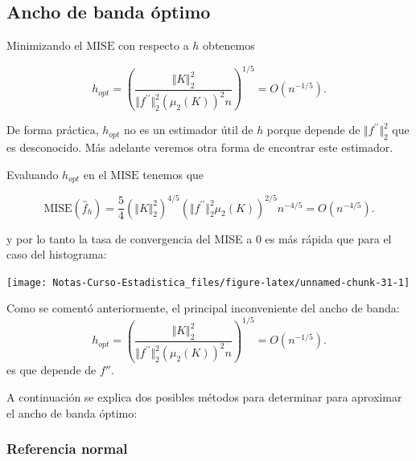 \documentclass[
  12pt,
]{book}
\begin{document}
\hypertarget{ancho-de-banda-uxf3ptimo}{%
\subsection{Ancho de banda óptimo}\label{ancho-de-banda-uxf3ptimo}}

Minimizando el \(\mathrm{MISE}\) con respecto a \(h\) obtenemos

\begin{equation*}
h_{opt}=\left(\frac{\Vert K\Vert_{2}^{2}}{\Vert f^{\prime\prime}\Vert_{2}^{2}\left(\mu_{2}(K)\right)^{2}n}\right)^{1/5}=O\left( n^{-1/5} \right).
\end{equation*}

De forma práctica, \(h_{opt}\) no es un estimador útil de \(h\) porque
depende de \(\Vert f^{\prime\prime}\Vert_{2}^{2}\) que es desconocido.
Más adelante veremos otra forma de encontrar este estimador.

Evaluando \(h_{opt}\) en el \(\mathrm{MISE}\) tenemos que

\begin{equation*}
\mathrm{MISE}(\hat{f}_{h})=\frac{5}{4}\left(\Vert K\Vert_{2}^{2}\right)^{4/5}\left(\Vert f^{\prime\prime}\Vert_{2}^{2}\mu_{2}(K)\right)^{2/5}n^{-4/5} = O\left( n^{-4/5} \right).
\end{equation*}

y por lo tanto la tasa de convergencia del MISE a 0 es más rápida que
para el caso del histograma:

\begin{center}\texttt{[image: Notas-Curso-Estadistica\_files/figure-latex/unnamed-chunk-31-1]} \end{center}

Como se comentó anteriormente, el principal inconveniente del ancho de
banda: \begin{equation*}
h_{opt}=\left(\frac{\Vert K\Vert_{2}^{2}}{\Vert f^{\prime\prime}\Vert_{2}^{2}\left(\mu_{2}(K)\right)^{2}n}\right)^{1/5}=O\left( n^{-1/5} \right).
\end{equation*} es que depende de \(f''\).

A continuación se explica dos posibles métodos para determinar para
aproximar el ancho de banda óptimo:

\hypertarget{referencia-normal}{%
\subsubsection{Referencia normal}\label{referencia-normal}}
\end{document}
